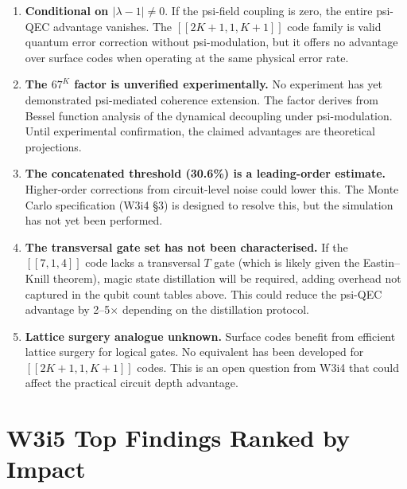 \documentclass[11pt]{article}
\theoremstyle{definition}
\theoremstyle{remark}
\begin{document}
\begin{enumerate}
  \item \textbf{Conditional on $|\lambda-1| \neq 0$}.  If the psi-field
    coupling is zero, the entire psi-QEC advantage vanishes.  The
    $[[2K+1,1,K+1]]$ code family is valid quantum error correction
    without psi-modulation, but it offers no advantage over surface codes
    when operating at the same physical error rate.

  \item \textbf{The $67^K$ factor is unverified experimentally.}  No
    experiment has yet demonstrated psi-mediated coherence extension.
    The factor derives from Bessel function analysis of the dynamical
    decoupling under psi-modulation.  Until experimental confirmation,
    the claimed advantages are theoretical projections.

  \item \textbf{The concatenated threshold (30.6\%) is a leading-order
    estimate.}  Higher-order corrections from circuit-level noise could
    lower this.  The Monte Carlo specification (W3i4 \S3) is designed
    to resolve this, but the simulation has not yet been performed.

  \item \textbf{The transversal gate set has not been characterised.}
    If the $[[7,1,4]]$ code lacks a transversal $T$ gate (which is
    likely given the Eastin--Knill theorem), magic state distillation
    will be required, adding overhead not captured in the qubit count
    tables above.  This could reduce the psi-QEC advantage by 2--5$\times$
    depending on the distillation protocol.

  \item \textbf{Lattice surgery analogue unknown.}  Surface codes benefit
    from efficient lattice surgery for logical gates.  No equivalent
    has been developed for $[[2K+1,1,K+1]]$ codes.  This is an open
    question from W3i4 that could affect the practical circuit depth
    advantage.
\end{enumerate}

\section{W3i5 Top Findings Ranked by Impact}
\label{sec:top-findings}
\end{document}
